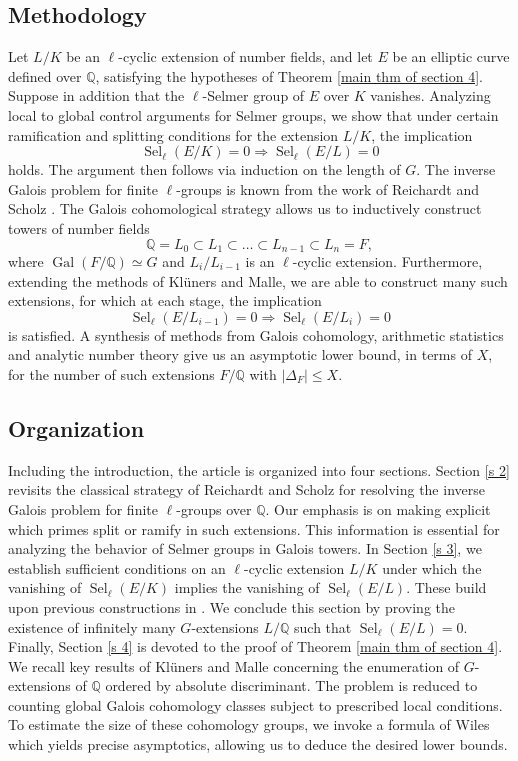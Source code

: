 \documentclass[11pt,reqno]{amsart}
\newcommand{\Q}{\mathbb{Q}}
\newcommand{\op}[1]{\operatorname{#1}}
\numberwithin{equation}{section}
\begin{document}
\subsection{Methodology}
Let \( L/K \) be an \( \ell \)-cyclic extension of number fields, and let \( E \) be an elliptic curve defined over \( \Q \), satisfying the hypotheses of Theorem \ref{main thm of section 4}. Suppose in addition that the \( \ell \)-Selmer group of \( E \) over \( K \) vanishes. Analyzing local to global control arguments for Selmer groups, we show that under certain ramification and splitting conditions for the extension $L/K$, the implication
\[
\operatorname{Sel}_\ell(E/K) = 0  \Rightarrow  \operatorname{Sel}_\ell(E/L) = 0
\]
holds. The argument then follows via induction on the length of $G$. The inverse Galois problem for finite $\ell$-groups is known from the work of Reichardt \cite{Reichardt} and Scholz \cite{Scholz}. The Galois cohomological strategy allows us to inductively construct towers of number fields 
\[\Q=L_0\subset L_1\subset \dots \subset L_{n-1}\subset L_n=F,\] where $\op{Gal}(F/\Q)\simeq G$ and $L_i/L_{i-1}$ is an $\ell$-cyclic extension. Furthermore, extending the methods of Kl\"uners and Malle, we are able to construct many such extensions, for which at each stage, the implication 
\[\op{Sel}_\ell(E/L_{i-1})=0\Rightarrow \op{Sel}_\ell(E/L_{i})=0\]
is satisfied. A synthesis of methods from Galois cohomology, arithmetic statistics and analytic number theory give us an asymptotic lower bound, in terms of $X$, for the number of such extensions $F/\Q$ with $|\Delta_F|\leq X$.

\subsection{Organization}
Including the introduction, the article is organized into four sections. Section \ref{s 2} revisits the classical strategy of Reichardt \cite{Reichardt} and Scholz \cite{Scholz} for resolving the inverse Galois problem for finite \( \ell \)-groups over \( \Q \). Our emphasis is on making explicit which primes split or ramify in such extensions. This information is essential for analyzing the behavior of Selmer groups in Galois towers. In Section \ref{s 3}, we establish sufficient conditions on an \( \ell \)-cyclic extension \( L/K \) under which the vanishing of \( \operatorname{Sel}_\ell(E/K) \) implies the vanishing of \( \operatorname{Sel}_\ell(E/L) \). These build upon previous constructions in \cite[Section 2]{pathakray}. We conclude this section by proving the existence of infinitely many \( G \)-extensions \( L/\Q \) such that \( \operatorname{Sel}_\ell(E/L) = 0 \). Finally, Section \ref{s 4} is devoted to the proof of Theorem \ref{main thm of section 4}. We recall key results of Kl\"uners and Malle concerning the enumeration of \( G \)-extensions of \( \Q \) ordered by absolute discriminant. The problem is reduced to counting global Galois cohomology classes subject to prescribed local conditions. To estimate the size of these cohomology groups, we invoke a formula of Wiles which yields precise asymptotics, allowing us to deduce the desired lower bounds.
\end{document}
